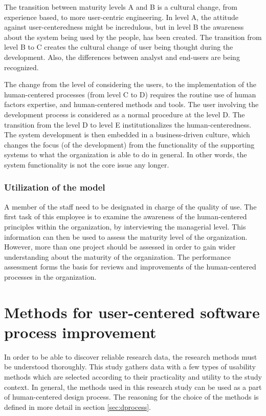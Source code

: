 \documentclass[12pt,a4paper,oneside,pdftex]{report}
\begin{document}
The transition between maturity levels A and B is a cultural change, from experience based, to more user-centric engineering. In level A, the attitude against user-centeredness might be incredulous, but in level B the awareness about the system being used by the people, has been created. The transition from level B to C creates the cultural change of user being thought during the development. Also, the differences between analyst and end-users are being recognized. \cite{RefWorks:30}

The change from the level of considering the users, to the implementation of the human-centered processes (from level C to D) requires the routine use of human factors expertise, and human-centered methods and tools. The user involving the development process is considered as a normal procedure at the level D. The transition from the level D to level E institutionalizes the human-centeredness. The system development is then embedded in a business-driven culture, which changes the focus (of the development) from the functionality of the supporting systems to what the organization is able to do in general. In other words, the system functionality is not the core issue any longer.  \cite{RefWorks:30}

\subsection{Utilization of the model}

A member of the staff need to be designated in charge of the quality of use. The first task of this employee is to examine the awareness of the human-centered principles within the organization, by interviewing the managerial level. This information can then be used to assess the maturity level of the organization. However, more than one project should be assessed in order to gain wider understanding about the maturity of the organization. The performance assessment forms the basis for reviews and improvements of the human-centered processes in the organization. \cite{RefWorks:30}

\chapter{Methods for user-centered software process improvement}
\label{chapter:methods}


In order to be able to discover reliable research data, the research methods must be understood thoroughly. This study gathers data with a few types of usability methods which are selected according to their practicality and utility to the study context. In general, the methods used in this research study can be used as a part of human-centered design process. The reasoning for the choice of the methods is defined in more detail in section \ref{sec:dprocess}. 
\end{document}

